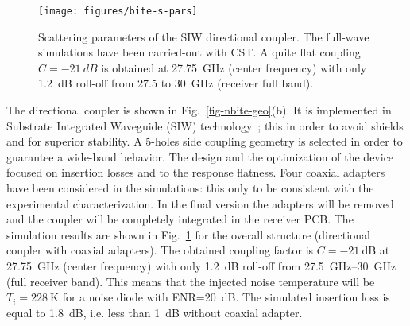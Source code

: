 \documentclass[conference,10pt,a4paper]{IEEEtran}%
\begin{document}
\begin{figure}[tb]
	\centering
	\texttt{[image: figures/bite-s-pars]}
	\caption{
		Scattering parameters of the SIW directional coupler.
		The full-wave simulations have been carried-out with CST.
		A quite flat coupling $C=\SI{-21}{dB}$ is obtained at \SI{27.75}{GHz} (center frequency) with only \SI{1.2}{dB} roll-off from 27.5 to \SI{30}{GHz} (receiver full band).
	}
	\label{fig-nbite-res}
\end{figure}
The directional coupler is shown in Fig.~\ref{fig-nbite-geo}(b).
It is implemented in Substrate Integrated Waveguide (SIW) technology~\cite{Doghri2015}; this in order to avoid shields and for superior stability.
A 5-holes side coupling geometry is selected in order to guarantee a wide-band behavior.
The design and the optimization of the device focused on insertion losses and to the response flatness.
Four coaxial adapters have been considered in the simulations: this only to be consistent with the experimental characterization.
In the final version the adapters will be removed and the coupler will be completely integrated in the receiver PCB.
The simulation results are shown in Fig.~\ref{fig-nbite-res} for the overall structure (directional coupler with coaxial adapters).
The obtained coupling factor is $C=\SI{-21}{\dB}$ at \SI{27.75}{\GHz} (center frequency) with only \SI{1.2}{\dB} roll-off from \SIrange{27.5}{30}{\GHz} (full receiver band).
This means that the injected noise temperature will be $T_i=\SI{228}{\kelvin}$ for a noise diode with ENR=\SI{20}{\dB}.
The simulated insertion loss is equal to \SI{1.8}{\dB}, i.e. less than \SI{1}{\dB} without coaxial adapter.
\end{document}
